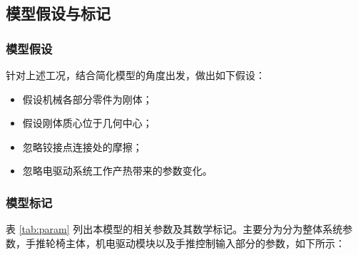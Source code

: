 \subsection{模型假设与标记}

\subsubsection{模型假设}

针对上述工况，结合简化模型的角度出发，做出如下假设：

\begin{itemize}
	
	\item 假设机械各部分零件为刚体；
	
	\item 假设刚体质心位于几何中心；
	
	\item 忽略铰接点连接处的摩擦；
	
	\item 忽略电驱动系统工作产热带来的参数变化。
	
\end{itemize}

\subsubsection{模型标记}

表 \ref{tab:param} 列出本模型的相关参数及其数学标记。主要分为分为整体系统参数，手推轮椅主体，机电驱动模块以及手推控制输入部分的参数，如下所示：

